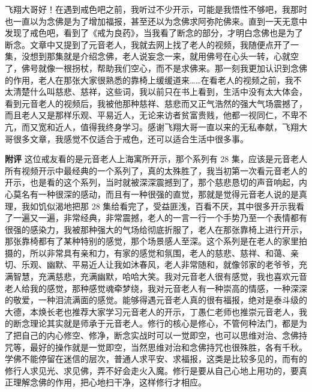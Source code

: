 \begin{case}
    飞翔大哥好！在遇到戒色吧之前，我听过不少开示，可能是我悟性不够吧，我那时也一直以为念佛是为了增加福报，甚至还以为念佛求阿弥陀佛来。直到一天无意中发现了戒色吧，看到了《戒为良药》，当我看了断念的部分，才明白念佛也是为了断念。文章中又提到了元音老人，我就去网上找了老人的视频，我随便点开了一集，没想到那集就是介绍念佛，老人说妄念一来，就用佛号在心头一转，心就空了，佛号就像一根拐杖，帮助我们空心，而不是求佛来。那一刻我更加认识到念佛的作用，老人在那张大家很熟悉的靠椅上缓缓道来……在看老人的视频之前，我不太清楚什么叫慈悲、慈祥，这些词，我以前只在书上看到，生活中没有太大体会，看到元音老人的视频后，我被他那种慈祥、慈悲而又正气浩然的强大气场震撼了，而且老人又是那样乐观、平易近人，无论来访者贫富贵贱，他都一视同仁，不卑不亢，而又宽和近人，值得我终身学习。感谢飞翔大哥一直以来的无私奉献，飞翔大哥很多文章，我感觉不仅适合于戒色，还可以适合生活中很多事。

    \textbf{附评} 这位戒友看的是元音老人上海寓所开示，那个系列有 28 集，应该是元音老人所有视频开示中最经典的一个系列了，真的太殊胜了，我当初第一次看元音老人的开示，也是看的这个系列，当时就被深深震撼到了，那个慈悲恳切的声音响起，内心莫名有一种很深的感动，而且有一种很强的直觉，那就是觉得元音老人说的是真理，我如饥似渴地把那 28 集给看完了，受益匪浅，百看不厌，其中很多开示我看了一遍又一遍，非常经典，非常震撼，老人的一言一行一个手势乃至一个表情都有很强的感染力，我被那种强大的气场给彻底折服了，老人在那张靠椅上进行开示，那张靠椅都有了某种特别的感觉，那个场景感人至深。这个系列是在老人的家里拍摄的，所以非常具有亲和力，有家的感觉和氛围，老人的慈悲、慈祥、和蔼、亲切、乐观、幽默、平易近人让我如沐春风，老人非常随和，就像邻家的老爷爷，充满智慧，充满慈悲，充满幽默，哈哈大笑。我对元音老人很有感觉，我也喜欢元音老人给我的感觉，那种感觉魂牵梦绕，我对元音老人有一种崇高的情感，一种深深的敬爱，一种泪流满面的感觉。能够得遇元音老人真的很有福报，绝对是泰斗级的大德，本焕长老也推荐大家学习元音老人的开示，丁愚仁老师也推崇元音老人，我的断念理论其实就是师承于元音老人。修行的核心是修心，不管何种法门，都是为了把自己的内心修空、修净，断念实战时可以一觉即空，也可以思维对治、念佛持咒等，最好的操作就是一觉即空，当然思维对治和念佛持咒也很殊胜，各有千秋。学佛不能停留在迷信的层次，普通人求平安、求福报，这类是比较多见的，而有的修行人求见光、求见佛，弄不好会走火入魔。修行是要从自己心地上用功的，要真正理解念佛的作用，把心地扫干净，这样修行才相应。
\end{case}

